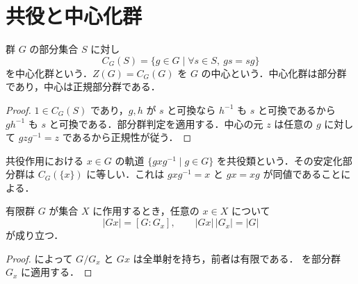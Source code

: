 \section{共役と中心化群}
\begin{defn}[中心と中心化群]
群 $G$ の部分集合 $S$ に対し
\[
 C_G(S)=\{g\in G\mid \forall s\in S,\ gs=sg\}
\]
を中心化群という．$Z(G)=C_G(G)$ を $G$ の中心という．中心化群は部分群であり，中心は正規部分群である．
\end{defn}
\begin{proof}
$1\in C_G(S)$ であり，$g,h$ が $s$ と可換なら $h^{-1}$ も $s$ と可換であるから $gh^{-1}$ も $s$ と可換である．部分群判定を適用する．中心の元 $z$ は任意の $g$ に対して $gzg^{-1}=z$ であるから正規性が従う．
\end{proof}
\begin{defn}[共役類]
共役作用における $x\in G$ の軌道 $\{gxg^{-1}\mid g\in G\}$ を共役類という．その安定化部分群は $C_G(\{x\})$ に等しい．これは $gxg^{-1}=x$ と $gx=xg$ が同値であることによる．
\end{defn}
\begin{prop}[有限群の軌道の濃度]
有限群 $G$ が集合 $X$ に作用するとき，任意の $x\in X$ について
\[
 |Gx|=[G:G_x],\qquad |Gx|\,|G_x|=|G|
\]
が成り立つ．
\end{prop}
\begin{proof}
 によって $G/G_x$ と $Gx$ は全単射を持ち，前者は有限である． を部分群 $G_x$ に適用する．
\end{proof}
